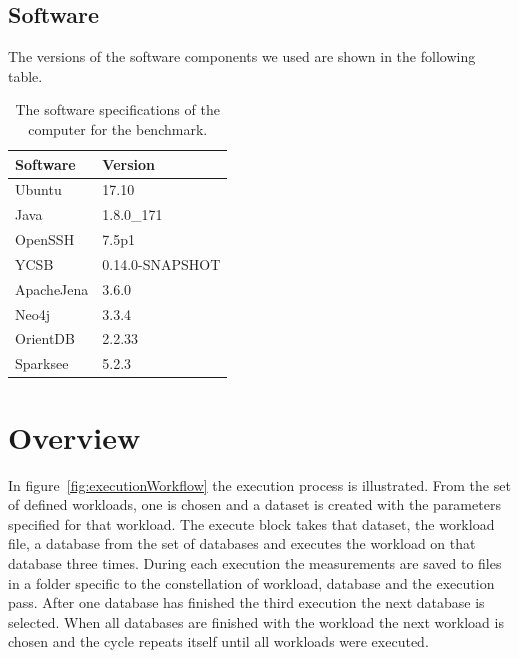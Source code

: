 \subsection{Software}
The versions of the software components we used are shown in the following table.

\begin{table}[!h]
  \begin{minipage}{\textwidth}
    \begin{tabularx}{\textwidth}{ | X | X | }
      \hline
      Software & Version \\ \hline \hline
      Ubuntu & 17.10 \\ \hline
      Java & 1.8.0\_171 \\ \hline
      OpenSSH & 7.5p1 \\ \hline
      YCSB & 0.14.0-SNAPSHOT \\ \hline
      ApacheJena & 3.6.0 \\ \hline
      Neo4j & 3.3.4 \\ \hline
      OrientDB & 2.2.33 \\ \hline
      Sparksee & 5.2.3 \\ \hline
    \end{tabularx}
  \end{minipage}
  \caption{The software specifications of the computer for the benchmark.}
  \label{tab:software}
\end{table}

\section{Overview}
\label{ch:evaluation:se:overview}
In figure~\ref{fig:executionWorkflow} the execution process is illustrated.
From the set of defined workloads,
one is chosen and a dataset is created with the parameters specified for that workload.
The execute block takes that dataset,
the workload file,
a database from the set of databases and executes the workload on that database three times.
During each execution the measurements are saved to files in a folder specific to the constellation of workload,
database and the execution pass.
After one database has finished the third execution the next database is selected.
When all databases are finished with the workload the next workload is chosen and the cycle repeats itself until all workloads were executed.

